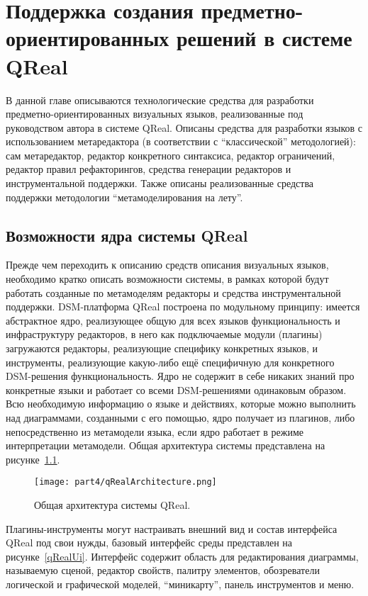 \chapter{Поддержка создания предметно-ориентированных решений в системе QReal}
\label{chapter:implementation}

В данной главе описываются технологические средства для разработки предметно-ориентированных 
визуальных языков, реализованные под руководством автора в системе QReal. Описаны 
средства для разработки языков с использованием метаредактора (в соответствии с "`классической"' 
методологией): сам метаредактор, редактор конкретного синтаксиса, редактор ограничений, 
редактор правил рефакторингов, средства генерации редакторов и инструментальной поддержки. 
Также описаны реализованные средства поддержки методологии "`метамоделирования на лету"'.

\section{Возможности ядра системы QReal}
Прежде чем переходить к описанию средств описания визуальных языков, необходимо кратко 
описать возможности системы, в рамках которой будут работать созданные по метамоделям 
редакторы и средства инструментальной поддержки. DSM-платформа QReal построена по 
модульному принципу: имеется абстрактное ядро, реализующее общую для всех языков функциональность 
и инфраструктуру редакторов, в него как подключаемые модули (плагины) загружаются редакторы, 
реализующие специфику конкретных языков, и инструменты, реализующие какую-либо ещё 
специфичную для конкретного DSM-решения функциональность. Ядро не содержит в себе 
никаких знаний про конкретные языки и работает со всеми DSM-решениями одинаковым образом. 
Всю необходимую информацию о языке и действиях, которые можно выполнить над диаграммами, 
созданными с его помощью, ядро получает из плагинов, либо непосредственно из метамодели 
языка, если ядро работает в режиме интерпретации метамодели. Общая архитектура системы 
представлена на рисунке~\ref{qRealArchitecture}.

\begin{figure} [ht]
	\begin{center}
		\texttt{[image: part4/qRealArchitecture.png]}
		\caption{Общая архитектура системы QReal.}
		\label{qRealArchitecture}
	\end{center}
\end{figure}

Плагины-инструменты могут настраивать внешний вид и состав интерфейса QReal под свои 
нужды, базовый интерфейс среды представлен на рисунке~\ref{qRealUi}. Интерфейс содержит 
область для редактирования диаграммы, называемую сценой, редактор свойств, палитру 
элементов, обозреватели логической и графической моделей, "`миникарту"', панель инструментов и меню.

